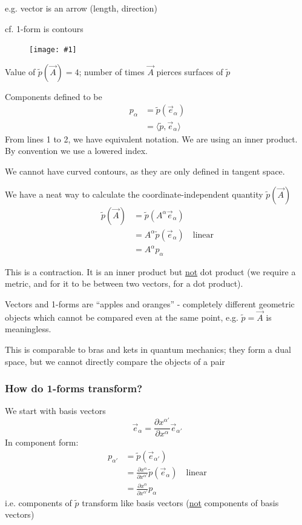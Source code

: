 \documentclass[a4paper]{article} %
\newcommand{\picturesize}[2]
{
\begin{figure}[h]
\centering
\texttt{[image: \#1]}
\end{figure}
}
\renewcommand{\tilde}{\widetilde}
\begin{document}
e.g. vector is an arrow (length, direction)

cf. 1-form is contours

\picturesize{images/contour.png}{0.3}
Value of $\widetilde{p}(\vec{A})=4$; number of times $\vec{A}$ pierces surfaces of $\widetilde{p}$

Components defined to be
\begin{align*}
p_\alpha&=\widetilde{p}(\vec{e}_{\alpha})\\
&=\langle{\tilde{p},\vec{e}_{\alpha}}\rangle
\end{align*}
From lines 1 to 2, we have equivalent notation. We are using an inner product. By convention we use a lowered index.

We cannot have curved contours, as they are only defined in tangent space.

We have a neat way to calculate the coordinate-independent quantity $\tilde{p}(\vec{A})$
\begin{align*}
\tilde{p}(\vec{A})&=\tilde{p}(A^{\alpha}\vec{e}_{\alpha})\\
&=A^{\alpha}\tilde{p}(\vec{e}_{\alpha})\quad\text{linear}\\
&=A^{\alpha}p_{\alpha}
\end{align*}

This is a contraction. It is an inner product but \underline{not} dot product (we require a metric, and for it to be between two vectors, for a dot product).

Vectors and 1-forms are ``apples and oranges'' - completely different geometric objects which cannot be compared even at the same point, e.g. $\tilde{p}=\vec{A}$ is meaningless.

This is comparable to bras and kets in quantum mechanics; they form a dual space, but we cannot directly compare the objects of a pair

\subsubsection{How do 1-forms transform?}
We start with basis vectors
\begin{equation}
\vec{e}_{\alpha}=\frac{\partial x^{\alpha'}}{\partial x^{\alpha}}\vec{e}_{\alpha'}
\end{equation}
In component form:
\begin{align*}
p_{\alpha'}&=\tilde{p}(\vec{e}_{\alpha'})\\
&=\frac{\partial x^{\alpha}}{\partial x^{\alpha'}}\tilde{p}(\vec{e}_{\alpha})\quad\text{linear}\\
&=\frac{\partial x^{\alpha}}{\partial x^{\alpha'}}p_{\alpha}
\end{align*}
i.e. components of $\tilde{p}$ transform like basis vectors (\underline{not} components of basis vectors)
\end{document}
